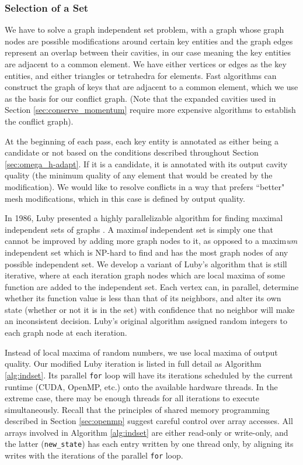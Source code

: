 \subsubsection{Selection of a Set}
\label{sec:indset_select}

We have to solve a graph independent set problem, with a graph whose
graph nodes are possible modifications around certain key entities
and the graph edges represent an overlap between their cavities,
in our case meaning the key entities are adjacent to a common element.
We have either vertices or edges as the key entities, and either
triangles or tetrahedra for elements.
Fast algorithms can construct the graph of keys that are adjacent
to a common element, which we use as the basis for our conflict graph.
(Note that the expanded cavities used in Section \ref{sec:conserve_momentum}
require more expensive algorithms to establish the conflict graph).

At the beginning of each pass, each key entity is annotated as either
being a candidate or not based on the conditions described throughout
Section \ref{sec:omega_h-adapt}.
If it is a candidate, it is annotated with its output cavity quality
(the minimum quality of any element that would be created by the modification).
We would like to resolve conflicts in a way that prefers ``better" mesh
modifications, which in this case is defined by output quality.

In 1986, Luby presented a highly parallelizable algorithm
for finding maximal independent sets of graphs \cite{luby1986simple}.
A maxim\emph{al} independent set is simply one that cannot be improved by
adding more graph nodes to it, as opposed to a maxim\emph{um} independent
set which is NP-hard to find and has the most graph nodes of any
possible independent set.
We develop a variant of Luby's algorithm that is still iterative,
where at each iteration graph nodes which are local maxima of some function
are added to the independent set.
Each vertex can, in parallel, determine whether its function value is
less than that of its neighbors, and alter its own state
(whether or not it is in the set)
with confidence that no neighbor will make an inconsistent decision.
Luby's original algorithm assigned random integers to each graph node
at each iteration.

Instead of local maxima of random numbers, we use local maxima of
output quality.
Our modified Luby iteration is listed in full detail
as Algorithm \ref{alg:indset}.
Its parallel \texttt{for} loop will have its iterations scheduled by the
current runtime (CUDA, OpenMP, etc.) onto the available hardware threads.
In the extreme case, there may be enough threads for all iterations
to execute simultaneously.
Recall that the principles of shared memory programming described
in Section \ref{sec:openmp} suggest careful control over array accesses.
All arrays involved in Algorithm \ref{alg:indset} are either read-only
or write-only, and the latter (\texttt{new\_state}) has each entry written
by one thread only, by aligning its writes with the iterations
of the parallel \texttt{for} loop.

